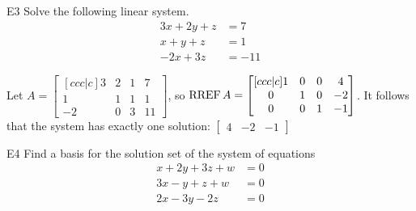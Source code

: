 \documentclass{sbgLAexam}
\begin{document}
\begin{extract}\newpage\end{extract}
\begin{problem}{E3}
Solve the following linear system.
\begin{align*}
3x+2y+z &= 7 \\
x+y+z &= 1 \\
-2x+3z &= -11
\end{align*}
\end{problem}
\begin{solution}
Let \(A =
  \begin{bmatrix}[ccc|c]
    3 & 2 & 1 & 7 \\
    1 & 1 & 1 & 1 \\
    -2 & 0 & 3 & 11
  \end{bmatrix}
\), so \(\operatorname{RREF} A =
  \begin{bmatrix}[ccc|c]
    1 & 0 & 0 & 4 \\
    0 & 1 & 0 & -2 \\
    0 & 0 & 1 & -1
  \end{bmatrix}
\). It follows that the system has exactly one solution:
\(\begin{bmatrix}
  4 & -2 & -1
\end{bmatrix}\)
\end{solution}
\begin{problem}{E4}
Find a basis for the solution set of the system of equations
\begin{align*}
x+2y+3z+w &= 0 \\
3x-y+z+w &= 0 \\
2x-3y-2z &= 0
\end{align*}
\end{problem}
\end{document}
